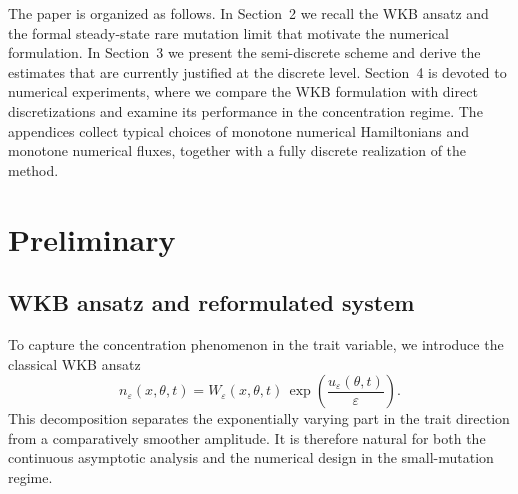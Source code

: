 \documentclass[11pt, dina4, amsfont12]{article}
\begin{document}
The paper is organized as follows. In Section~2 we recall the WKB ansatz and the formal steady-state rare mutation limit that motivate the numerical formulation. In Section~3 we present the semi-discrete scheme and derive the estimates that are currently justified at the discrete level. Section~4 is devoted to numerical experiments, where we compare the WKB formulation with direct discretizations and examine its performance in the concentration regime. The appendices collect typical choices of monotone numerical Hamiltonians and monotone numerical fluxes, together with a fully discrete realization of the method.


\section{Preliminary}

\subsection{WKB ansatz and reformulated system}

To capture the concentration phenomenon in the trait variable, we introduce the classical WKB ansatz
\begin{equation}\label{eq:WKB}
   n_\varepsilon(x,\theta,t)
   = W_\varepsilon(x,\theta,t)\,
   \exp\!\left(\frac{u_\varepsilon(\theta,t)}{\varepsilon}\right).
\end{equation}
This decomposition separates the exponentially varying part in the trait direction from a comparatively smoother amplitude. It is therefore natural for both the continuous asymptotic analysis and the numerical design in the small-mutation regime.
\end{document}

